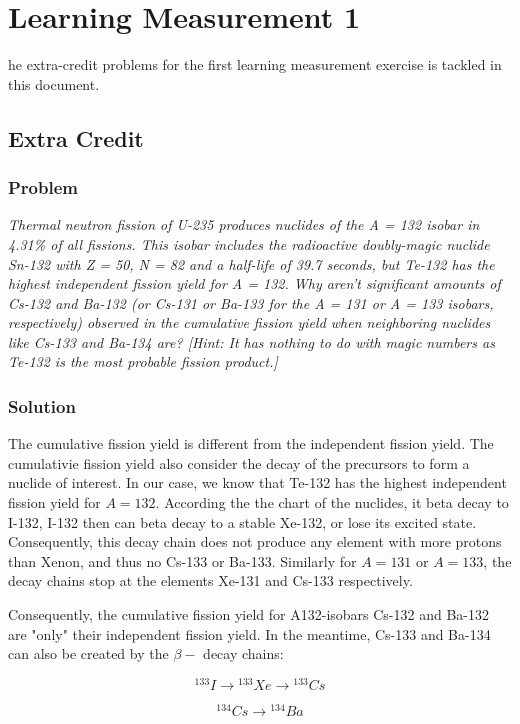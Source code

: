 %
%
\let\textcircled=\pgftextcircled
\chapter{Learning Measurement 1}
\label{chap:intro}

he extra-credit problems for the first learning measurement exercise is tackled in this document.

\section{Extra Credit}
\label{probec}


\subsection{Problem}
\textit{Thermal neutron fission of U-235 produces nuclides of the A = 132 isobar in 4.31\% of all fissions. This isobar includes the radioactive doubly-magic nuclide Sn-132 with Z = 50, N = 82 and a half-life of 39.7 seconds, but Te-132 has the highest independent fission yield for A = 132. Why aren't significant amounts of Cs-132 and Ba-132 (or Cs-131 or Ba-133 for the A = 131 or A = 133 isobars, respectively) observed in the cumulative fission yield when neighboring nuclides like Cs-133 and Ba-134 are?
[Hint: It has nothing to do with magic numbers as Te-132 is the most probable fission product.]}

\subsection{Solution}

The cumulative fission yield is different from the independent fission yield. The cumulativie fission yield also consider the decay of the precursors to form a nuclide of interest. In our case, we know that Te-132 has the highest independent fission yield for $A = 132$. According the the chart of the nuclides, it beta decay to I-132, I-132 then can beta decay to a stable Xe-132, or lose its excited state. Consequently, this decay chain does not produce any element with more protons than Xenon, and thus no Cs-133 or Ba-133. Similarly for $A = 131$ or $A = 133$, the decay chains stop at the elements Xe-131 and Cs-133 respectively.

Consequently, the cumulative fission yield for A132-isobars Cs-132 and Ba-132 are "only" their independent fission yield. In the meantime, Cs-133 and Ba-134 can also be created by the $\beta -$ decay chains:

\begin{equation}
{}^{133}I \rightarrow {}^{133}Xe \rightarrow {}^{133}Cs
\end{equation}

\begin{equation}
{}^{134}Cs \rightarrow {}^{134}Ba
\end{equation}
